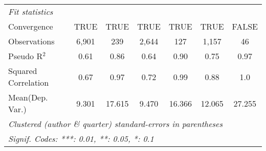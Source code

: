 \begin{tabular}{lcccccc}
   \midrule
   \emph{Fit statistics}\\
   Convergence                                                &TRUE            & TRUE    & TRUE          & TRUE        & TRUE          & FALSE\\  
   Observations                                               & 6,901          & 239     & 2,644         & 127         & 1,157         & 46\\  
   Pseudo R$^2$                                               & 0.61           & 0.86    & 0.64          & 0.90        & 0.75          & 0.97\\  
   Squared Correlation                                        & 0.67           & 0.97    & 0.72          & 0.99        & 0.88          & 1.0\\  
Mean(Dep. Var.) & 9.301 & 17.615 & 9.470 & 16.366 & 12.065 & 27.255 \\
   \midrule \midrule
   \multicolumn{7}{l}{\emph{Clustered (author \& quarter) standard-errors in parentheses}}\\
   \multicolumn{7}{l}{\emph{Signif. Codes: ***: 0.01, **: 0.05, *: 0.1}}\\
\end{tabular}
\par\endgroup
